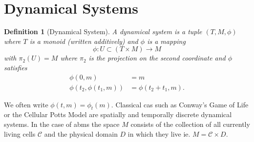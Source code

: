 \documentclass{article}
\newtheorem{definition}{Definition}[section]
\begin{document}
\section{Dynamical Systems}
\begin{definition}[Dynamical System]
    A dynamical system is a tuple $(T,M,\phi)$ where $T$ is a monoid (written additively) and
    $\phi$ is a mapping
    \begin{equation}
        \phi : U\subset(T\times M) \rightarrow M
    \end{equation}
    with $\pi_2(U) = M$ where $\pi_2$ is the projection on the second coordinate and $\phi$
    satisfies
    \begin{align}
        \phi(0,m) &= m\\
        \phi(t_2, \phi(t_1, m)) &= \phi(t_2+t_1,m).
    \end{align}
\end{definition}
We often write $\phi(t,m) = \phi_t(m)$.
Classical \acp{ca} such as Conway's Game of Life \cite{Graner1992} or the Cellular Potts Model
\cite{games1970fantastic} are spatially and temporally discrete dynamical systems.
In the case of \acp{abm} the space $M$ consists of the collection of all currently living cells
$\mathscr{C}$ and the physical domain $D$ in which they live ie. $M=\mathscr{C}\times D$.
\end{document}
